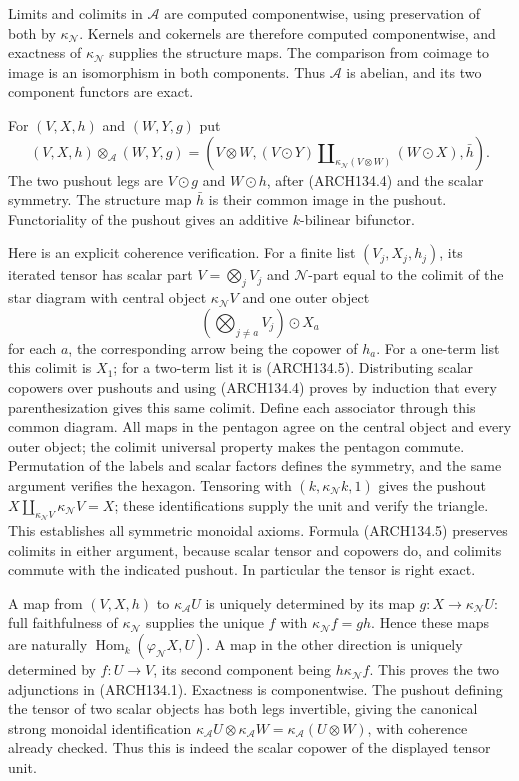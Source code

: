 Limits and colimits in $\mathcal A$ are computed componentwise, using
preservation of both by $\kappa_{\mathcal N}$.  Kernels and cokernels
are therefore computed componentwise, and exactness of
$\kappa_{\mathcal N}$ supplies the structure maps.  The comparison
from coimage to image is an isomorphism in both components.  Thus
$\mathcal A$ is abelian, and its two component functors are exact.

For $(V,X,h)$ and $(W,Y,g)$ put
\[
 (V,X,h)\otimes_{\mathcal A}(W,Y,g)
  =\left(V\otimes W,
     (V\odot Y)\amalg_{\kappa_{\mathcal N}(V\otimes W)}(W\odot X),
     \bar h\right).
 \tag{ARCH134.5}
\]
The two pushout legs are $V\odot g$ and $W\odot h$, after (ARCH134.4)
and the scalar symmetry.  The structure map $\bar h$ is their common
image in the pushout.  Functoriality of the pushout gives an additive
$k$-bilinear bifunctor.

Here is an explicit coherence verification.  For a finite list
$(V_j,X_j,h_j)$, its iterated tensor has scalar part
$V=\bigotimes_jV_j$ and $\mathcal N$-part equal to the colimit of the
star diagram with central object $\kappa_{\mathcal N}V$ and one outer
object
\[
                 \left(\bigotimes_{j\ne a}V_j\right)\odot X_a
\]
for each $a$, the corresponding arrow being the copower of $h_a$.
For a one-term list this colimit is $X_1$; for a two-term list it is
(ARCH134.5).  Distributing scalar copowers over pushouts and using
(ARCH134.4) proves by induction that every parenthesization gives this
same colimit.  Define each associator through this common diagram.
All maps in the pentagon agree on the central object and every outer
object; the colimit universal property makes the pentagon commute.
Permutation of the labels and scalar factors defines the symmetry,
and the same argument verifies the hexagon.  Tensoring with
$(k,\kappa_{\mathcal N}k,1)$ gives the pushout
$X\amalg_{\kappa_{\mathcal N}V}\kappa_{\mathcal N}V=X$;
these identifications supply the unit and verify the triangle.
This establishes all symmetric monoidal axioms.  Formula (ARCH134.5)
preserves colimits in either argument, because scalar tensor and
copowers do, and colimits commute with the indicated pushout.
In particular the tensor is right exact.

A map from $(V,X,h)$ to $\kappa_{\mathcal A}U$ is uniquely determined
by its map $g:X\to\kappa_{\mathcal N}U$: full faithfulness of
$\kappa_{\mathcal N}$ supplies the unique $f$ with
$\kappa_{\mathcal N}f=gh$.  Hence these maps are naturally
$\operatorname{Hom}_k(\varphi_{\mathcal N}X,U)$.
A map in the other direction is uniquely determined by $f:U\to V$,
its second component being $h\kappa_{\mathcal N}f$.
This proves the two adjunctions in (ARCH134.1).  Exactness is
componentwise.  The pushout defining the tensor of two scalar objects
has both legs invertible, giving the canonical strong monoidal
identification $\kappa_{\mathcal A}U\otimes\kappa_{\mathcal A}W
=\kappa_{\mathcal A}(U\otimes W)$, with coherence already checked.
Thus this is indeed the scalar copower of the displayed tensor unit.

